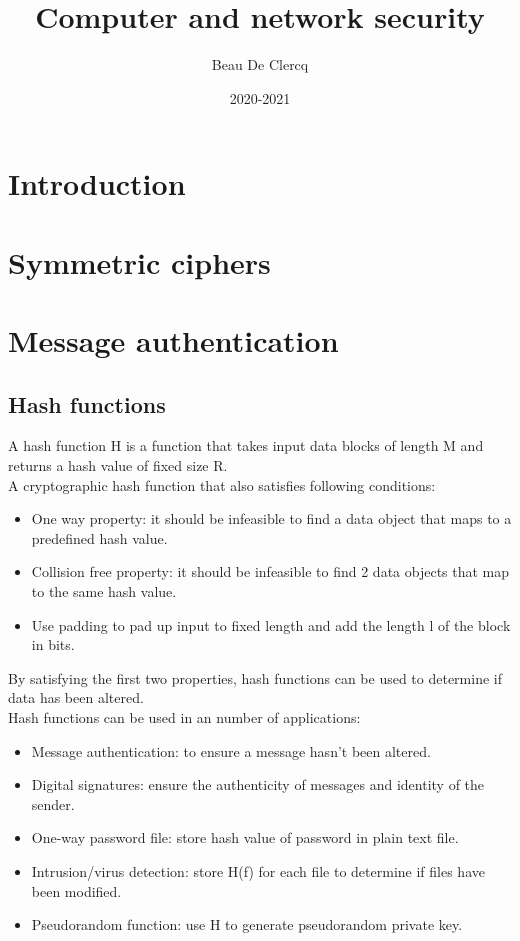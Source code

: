 \documentclass[12pt]{article}
\title{Computer and network security}
\author{Beau De Clercq}
\date{2020-2021}
\begin{document}
	
 \maketitle{}
 
 \tableofcontents
 
 \clearpage
 \newpage
 
 \section{Introduction}
 
 \section{Symmetric ciphers}
 
 \section{Message authentication}
 \subsection{Hash functions}
 A hash function H is a function that takes input data blocks of length M and returns a hash value of fixed size R.\\
 A cryptographic hash function that also satisfies following conditions:
 \begin{itemize}
 	\item One way property: it should be infeasible to find a data object that maps to a predefined hash value.
 	\item Collision free property: it should be infeasible to find 2 data objects that map to the same hash value.
 	\item Use padding to pad up input to fixed length and add the length l of the block in bits. 
 \end{itemize}
By satisfying the first two properties, hash functions can  be used to determine if data has been altered.\\
Hash functions can be used in an number of applications:
\begin{itemize}
	\item Message authentication: to ensure a message hasn't been altered.
	\item Digital signatures: ensure the authenticity of messages and identity of the sender.
	\item One-way password file: store hash value of password in plain text file.
	\item Intrusion/virus detection: store H(f) for each file to determine if files have been modified.
	\item Pseudorandom function: use H to generate pseudorandom private key.
\end{itemize}
\end{document}
